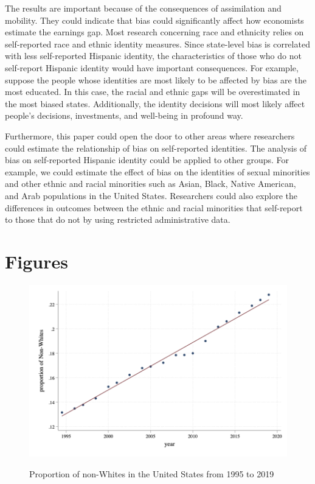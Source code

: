 \documentclass[12pt, fullpage]{article}
\begin{document}
The results are important because of the consequences of assimilation and mobility. They could indicate that bias could significantly affect how economists estimate the earnings gap. Most research concerning race and ethnicity relies on self-reported race and ethnic identity measures. Since state-level bias is correlated with less self-reported Hispanic identity, the characteristics of those who do not self-report Hispanic identity would have important consequences. For example, suppose the people whose identities are most likely to be affected by bias are the most educated. In this case, the racial and ethnic gaps will be overestimated in the most biased states. Additionally, the identity decisions will most likely affect people's decisions, investments, and well-being in profound way. 

Furthermore, this paper could open the door to other areas where researchers could estimate the relationship of bias on self-reported identities. The analysis of bias on self-reported Hispanic identity could be applied to other groups. For example, we could estimate the effect of bias on the identities of sexual minorities and other ethnic and racial minorities such as Asian, Black, Native American, and Arab populations in the United States. Researchers could also explore the differences in outcomes between the ethnic and racial minorities that self-report to those that do not by using restricted administrative data. 

\appendix

\section{Figures}

\begin{figure}[H]
\begin{center}
\caption{Proportion of non-Whites in the United States from 1995 to 2019}
\includegraphics[width=\textwidth]{GraphNonWhites.png} 
\label{fig:1}
\end{center}
\end{figure}
\end{document}
